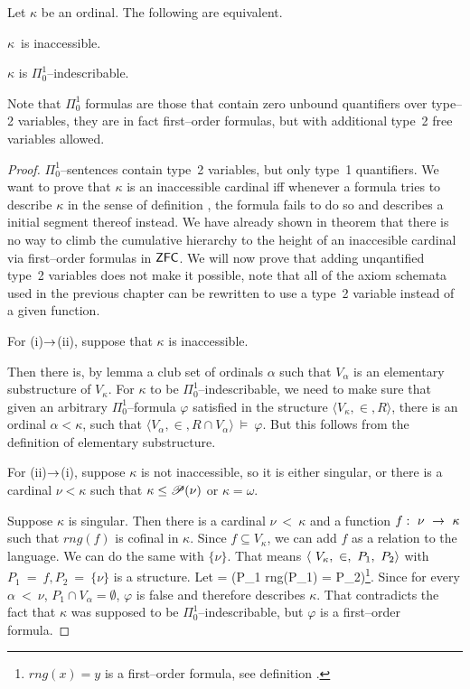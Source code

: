 \begin{theorem}
Let $\kappa$ be an ordinal. The following are equivalent.
\bce[(i)]
\item $\kappa$ is inaccessible.
\item $\kappa$ is $\Pi^1_0$–indescribable.
\ece
\end{theorem}

Note that $\Pi^1_0$ formulas are those that contain zero unbound quantifiers over type–2 variables, they are in fact first–order formulas, but with additional type~2 free variables allowed.

\begin{proof}
$\Pi^1_0$–sentences contain type~2 variables, but only type~1 quantifiers. We want to prove that $\kappa$ is an inaccessible cardinal iff whenever a formula tries to describe $\kappa$ in the sense of definition , the formula fails to do so and describes a initial segment thereof instead.
We have already shown in theorem  that there is no way to climb the cumulative hierarchy to the height of an inaccesible cardinal via first–order formulas in $\sf{ZFC}$. We will now prove that adding unqantified type~2 variables does not make it possible, note that all of the axiom schemata used in the previous chapter can be rewritten to use a type~2 variable instead of a given function.

For (i)$\rightarrow$(ii), suppose that $\kappa$ is inaccessible.

Then there is, by lemma  a club set of ordinals $\alpha$ such that $V_\alpha$ is an elementary substructure of $V_\kappa$. 
For $\kappa$ to be $\Pi^1_0$–indescribable, we need to make sure that given an arbitrary $\Pi^1_0$–formula $\varphi$ satisfied in the structure $\langle V_\kappa, \in, R \rangle$, there is an ordinal $\alpha < \kappa$, such that $\langle V_\alpha, \in, R \cap V_\alpha \rangle~\models~\varphi$. But this follows from the definition of elementary substructure.

For (ii)$\rightarrow$(i), suppose $\kappa$ is not inaccessible, so it is either singular, or there is a cardinal $\nu < \kappa$ such that $\kappa \leq \mathscr{P} (\nu)$ or $\kappa=\omega$. 


Suppose $\kappa$ is singular. Then there is a cardinal $\nu~<~\kappa$ and a function $f:~\nu~\rightarrow~\kappa$ such that $rng(f)$ is cofinal in $\kappa$. Since $f \subseteq V_\kappa$, we can add $f$ as a relation to the language. We can do the same with $\{\nu\}$. That means $\langle~V_\kappa,~\in,~P_1,~P_2\rangle$ with $P_1~=~f, P_2~=~\{\nu\}$ is a structure.
Let 
\beq
\varphi = (P_1 \neq \emptyset \et rng(P_1) = P_2)\footnote{$rng(x)=y$ is a first–order formula, see definition .}\mbox{.}
\eeq
Since for every $\alpha~<~\nu$, $P_1 \cap V_\alpha = \emptyset$, $\varphi$ is false and therefore describes $\kappa$. That contradicts the fact that $\kappa$ was supposed to be $\Pi^1_0$–indescribable, but $\varphi$ is a first–order formula.


\end{proof}
